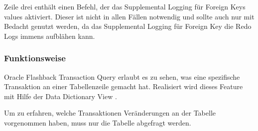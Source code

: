           Zeile drei enth\"alt einen Befehl, der das Supplemental Logging f\"ur Foreign Keys values aktiviert. Dieser ist nicht in allen F\"allen notwendig und sollte auch nur mit Bedacht genutzt werden, da das Supplemental Logging f\"ur Foreign Key die Redo Logs immens aufbl\"ahen kann.
        \subsubsection{Funktionsweise}
          Oracle Flashback Transaction Query erlaubt es zu sehen, was eine spezifische Transaktion an einer Tabellenzeile gemacht hat. Realisiert wird dieses Feature mit Hilfe der Data Dictionary View .

          Um zu erfahren, welche Transaktionen Ver\"anderungen an der Tabelle  vorgenommen haben, muss nur die Tabelle  abgefragt werden.

